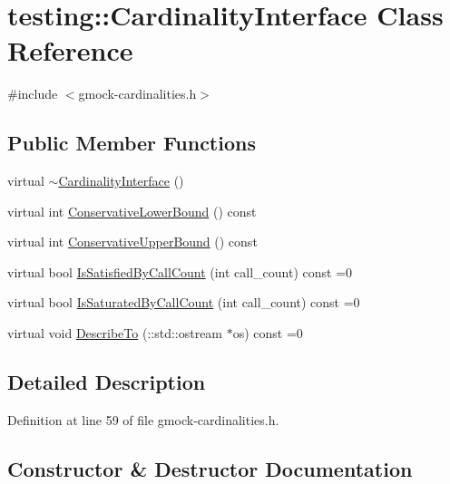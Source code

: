 \hypertarget{classtesting_1_1_cardinality_interface}{}\section{testing\+:\+:Cardinality\+Interface Class Reference}
\label{classtesting_1_1_cardinality_interface}


{\ttfamily \#include $<$gmock-\/cardinalities.\+h$>$}

\subsection*{Public Member Functions}
\begin{DoxyCompactItemize}
\item 
virtual \hyperlink{classtesting_1_1_cardinality_interface_a8d9f9fcf50e5517a7c28a97c1d0737d8}{$\sim$\+Cardinality\+Interface} ()
\item 
virtual int \hyperlink{classtesting_1_1_cardinality_interface_a15a7d3ba690ae8773ccd7f527fb3ce2d}{Conservative\+Lower\+Bound} () const 
\item 
virtual int \hyperlink{classtesting_1_1_cardinality_interface_ab17c434dc9de1925ed2ae4444594032f}{Conservative\+Upper\+Bound} () const 
\item 
virtual bool \hyperlink{classtesting_1_1_cardinality_interface_af89684f4ea6d9de331abf7958754d8f1}{Is\+Satisfied\+By\+Call\+Count} (int call\+\_\+count) const =0
\item 
virtual bool \hyperlink{classtesting_1_1_cardinality_interface_a42508cff9627de2e6f9c1ec33a7d8bf2}{Is\+Saturated\+By\+Call\+Count} (int call\+\_\+count) const =0
\item 
virtual void \hyperlink{classtesting_1_1_cardinality_interface_a8a93e3bbf24d14fe21186802ecef0929}{Describe\+To} (\+::std\+::ostream $\ast$os) const =0
\end{DoxyCompactItemize}


\subsection{Detailed Description}


Definition at line 59 of file gmock-\/cardinalities.\+h.



\subsection{Constructor \& Destructor Documentation}
